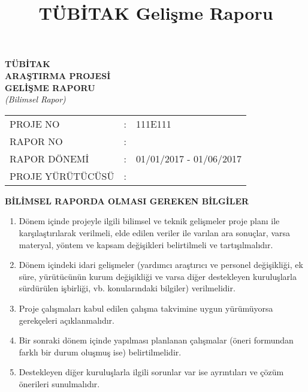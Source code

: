 \documentclass[a4paper,10pt]{article}
\title{TÜBİTAK Gelişme Raporu}
\begin{document}
\pagestyle{empty}
\begin{center}
\vspace*{1cm}

\Huge{{\bf 
TÜBİTAK \\
ARAŞTIRMA PROJESİ\\
GELİŞME RAPORU\\ }
\textit{(Bilimsel Rapor)}\\
}

\end{center}

\vspace*{1cm}

\newcommand{\projeno}{111E111\xspace{}}

\Large{ {\bf
\begin{tabular}{lcl}
PROJE NO	&			: & \projeno \\
RAPOR NO	&			: & \\
RAPOR DÖNEMİ &		: &  01/01/2017  -  01/06/2017 \\
PROJE YÜRÜTÜCÜSÜ &	: & \\
\end{tabular}
}
}


\vspace*{1cm}
\normalsize

\begin{center}
{\bf BİLİMSEL RAPORDA OLMASI GEREKEN BİLGİLER}\\
\end{center}

\begin{enumerate}
\item Dönem içinde projeyle ilgili bilimsel ve teknik gelişmeler proje planı ile karşılaştırılarak verilmeli, elde edilen veriler ile varılan ara sonuçlar, varsa materyal, yöntem ve kapsam değişikleri belirtilmeli ve tartışılmalıdır. 

\item Dönem içindeki idari gelişmeler (yardımcı araştırıcı ve personel değişikliği, ek süre, yürütücünün kurum değişikliği ve varsa diğer destekleyen kuruluşlarla sürdürülen işbirliği, vb. konularındaki bilgiler) verilmelidir. 

\item Proje çalışmaları kabul edilen çalışma takvimine uygun yürümüyorsa gerekçeleri açıklanmalıdır. 

\item Bir sonraki dönem içinde yapılması planlanan çalışmalar (öneri formundan farklı bir durum oluşmuş ise) belirtilmelidir. 

\item Destekleyen diğer kuruluşlarla ilgili sorunlar var ise ayrıntıları ve çözüm önerileri sunulmalıdır. 
\end{enumerate}
\end{document}
